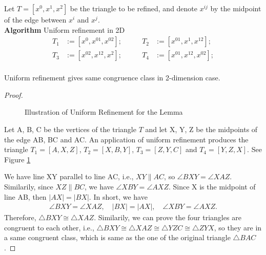     Let $T = [x^0, x^1, x^2]$ be the triangle to be refined, and denote $x^{ij}$ by the midpoint of the edge between $x^i$ and $x^j$.\\
    \textbf{Algorithm} Uniform refinement in 2D
    \begin{align*}
    T_1 &:= [x^0, x^{01}, x^{02}]; & \qquad T_2 &:= [x^{01}, x^{1}, x^{12}];\\
    T_3 &:= [x^{02}, x^{12}, x^2]; &\qquad T_4 &:= [x^{01}, x^{12}, x^{02}];\\
    \end{align*}
    



    \begin{lemma*}
    Uniform refinement gives same congruence class in 2-dimension case.
    \end{lemma*}
    \begin{proof}
    \begin{figure}
    \centering
    \caption{Illustration of Uniform Refinement for the Lemma}
    \label{Fig4}
    \end{figure}

    Let A, B, C be the vertices of the triangle $T$ and let X, Y, Z be the midpoints of the edge AB, BC and AC. An application of uniform refinement produces the triangle $T_1 = [A, X, Z]$, $T_2 = [X, B, Y]$, $T_3 = [Z, Y, C]$ and $T_4 = [Y, Z, X]$. See Figure \ref{Fig4}

    We have line XY parallel to line AC, i.e., $XY \parallel AC$, so $\angle{BXY} = \angle{XAZ}$. Similarily, since $XZ\parallel BC$, we have $\angle{XBY} = \angle{AXZ}$. Since X is the midpoint of line AB, then $|AX| = |BX|$. In short, we have 
    \begin{align*}
    \angle{BXY} = \angle{XAZ},
    \quad
    |BX| = |AX|,
    \quad
    \angle{XBY} = \angle{AXZ}.
    \end{align*}
    Therefore, $\triangle{BXY} \cong \triangle{XAZ}$. Similarily, we can prove the four triangles are congruent to each other, i.e., $\triangle{BXY}\cong\triangle{XAZ}\cong\triangle{YZC} \cong\triangle{ZYX}$, so they are in a same congruent class, which is same as the one of the original triangle $\triangle{BAC}$.
    \end{proof}
